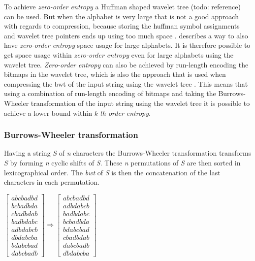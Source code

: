 To achieve \textit{zero-order entropy} a Huffman shaped wavelet tree (todo: reference) can be used. But when the alphabet is very large that is not a good approach with regards to compression, because storing the huffman symbol assignments and wavelet tree pointers ends up using too much space . \citep[Section~3]{Claude08practicalrankselect} describes a way to also have \textit{zero-order entropy} space usage for large alphabets. 
It is therefore possible to get space usage within \textit{zero-order entropy} even for large alphabets using the wavelet tree. 
\textit{Zero-order entropy} can also be achieved by run-length encoding the bitmaps in the wavelet tree, which is also the approach that is used when compressing the bwt of the input string using the wavelet tree \citep[Introduction (\textbf{B})]{waveletTreeEntropy}.
This means that using a combination of run-length encoding of bitmaps and taking the Burrows-Wheeler transformation of the input string using the wavelet tree it is possible to achieve a lower bound within \textit{k-th order entropy}.

\subsubsection{Burrows-Wheeler transformation}
Having a string \textit{S} of \textit{n} characters the Burrows-Wheeler transformation \citep{BWToriginalArticle} transforms \textit{S} by forming \textit{n} cyclic shifts of \textit{S}. 
These \textit{n} permutations of \textit{S} are then sorted in lexicographical order.
The \textit{bwt} of \textit{S} is then the concatenation of the last characters in each permutation.

\begin{center}
$\begin{bmatrix}
	abcbadbd\\
	bcbadbda\\
	cbadbdab\\
	badbdabc\\
	adbdabcb\\
	dbdabcba\\
	bdabcbad\\
	dabcbadb
\end{bmatrix} \Rightarrow
\begin{bmatrix}
abcbadbd\\
	adbdabcb\\
	badbdabc\\
	bcbadbda\\
	bdabcbad\\
	cbadbdab\\
	dabcbadb\\
	dbdabcba
\end{bmatrix}$
\end{center}

